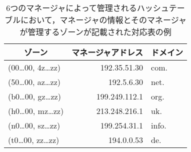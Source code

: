\begin{table}[htb]
 \caption[マネージャとゾーンの対応表]{6つのマネージャによって管理されるハッシュテーブルにおいて，マネージャの情報とそのマネージャが管理するゾーンが記載された対応表の例}
 \centering
  \begin{tabular}{lrl}
    \toprule
		\multicolumn{1}{c}{\textbf{ゾーン}} & \multicolumn{1}{c}{\textbf{マネージャアドレス}} & \multicolumn{1}{c}{\textbf{ドメイン}} \\
    \midrule
    (00…00, 4z…zz) & 192.35.51.30 & com.  \\
    (50…00, az…zz) & 192.5.6.30 & net. \\
    (b0…00, gz…zz) & 199.249.112.1 & org. \\
    (h0…00, mz…zz) & 213.248.216.1 & uk. \\
    (n0…00, sz…zz) & 199.254.31.1 & info. \\
    (t0…00, zz…zz) & 194.0.0.53 & de. \\
    \bottomrule
  \end{tabular}
 \label{tab:hash-management}
\end{table}
